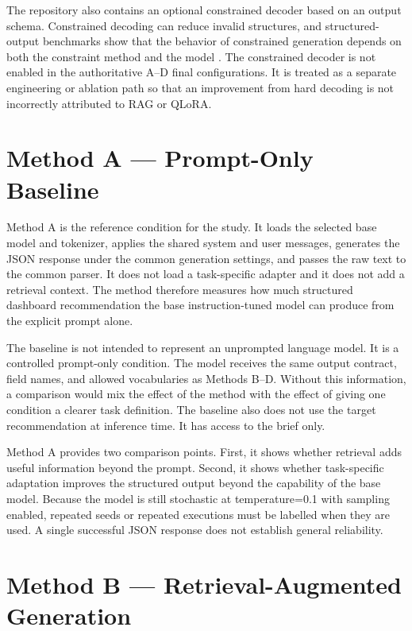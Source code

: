 The repository also contains an optional constrained decoder based on an output schema. Constrained decoding can reduce invalid structures, and structured-output benchmarks show that the behavior of constrained generation depends on both the constraint method and the model \cite{geng2025structured}. The constrained decoder is not enabled in the authoritative A--D final configurations. It is treated as a separate engineering or ablation path so that an improvement from hard decoding is not incorrectly attributed to RAG or QLoRA.

\section{Method A --- Prompt-Only Baseline}

Method A is the reference condition for the study. It loads the selected base model and tokenizer, applies the shared system and user messages, generates the JSON response under the common generation settings, and passes the raw text to the common parser. It does not load a task-specific adapter and it does not add a retrieval context. The method therefore measures how much structured dashboard recommendation the base instruction-tuned model can produce from the explicit prompt alone.

The baseline is not intended to represent an unprompted language model. It is a controlled prompt-only condition. The model receives the same output contract, field names, and allowed vocabularies as Methods B--D. Without this information, a comparison would mix the effect of the method with the effect of giving one condition a clearer task definition. The baseline also does not use the target recommendation at inference time. It has access to the brief only.

Method A provides two comparison points. First, it shows whether retrieval adds useful information beyond the prompt. Second, it shows whether task-specific adaptation improves the structured output beyond the capability of the base model. Because the model is still stochastic at temperature=0.1 with sampling enabled, repeated seeds or repeated executions must be labelled when they are used. A single successful JSON response does not establish general reliability.

\section{Method B --- Retrieval-Augmented Generation}

